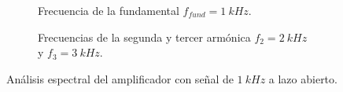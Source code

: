       \begin{figure}[H]
        \centering
        \begin{subfigure}[H]{0.48\textwidth}
          \caption{Frecuencia de la fundamental $f_{fund}=1~kHz$.}
          \label{fig:Exp7FrecFundamental}
        \end{subfigure}
        \hfill 
        \begin{subfigure}[H]{0.48\textwidth}
          \caption{Frecuencias de la segunda y tercer armónica $f_{2}=2~kHz$ y $f_{3}=3~kHz$.}
          \label{fig:Exp7Frec2da3raArmo}
        \end{subfigure}     
        \caption{Análisis espectral del amplificador con señal de $1~kHz$ a lazo abierto.}
        \label{fig:Exp7FrecFundYArmonicas}
      \end{figure}

